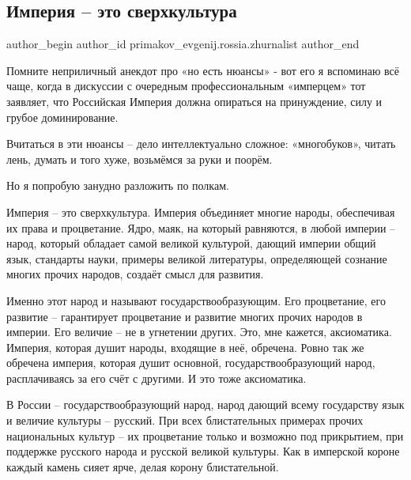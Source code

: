  
 
 
 
 
\subsection{Империя – это сверхкультура}
\label{sec:14_12_2020.fb.primakov_evgenij.rossia.zhurnalist.1.imperia_rossia}
\ifcmt
 author_begin
   author_id primakov_evgenij.rossia.zhurnalist
 author_end
\fi

Помните неприличный анекдот про «но есть нюансы» - вот его я вспоминаю всё
чаще, когда в дискуссии с очередным профессиональным «имперцем» тот заявляет,
что Российская Империя должна опираться на принуждение, силу и грубое
доминирование.

Вчитаться в эти нюансы – дело интеллектуально сложное: «многобуков», читать
лень, думать и того хуже, возьмёмся за руки и поорём. 

Но я попробую занудно разложить по полкам.

Империя – это сверхкультура. Империя объединяет многие народы, обеспечивая их
права и процветание. Ядро, маяк, на который равняются, в любой империи – народ,
который обладает самой великой культурой, дающий империи общий язык, стандарты
науки, примеры великой литературы, определяющей сознание многих прочих народов,
создаёт смысл для развития.

Именно этот народ и называют государствообразующим. Его процветание, его
развитие – гарантирует процветание и развитие многих прочих народов в империи.
Его величие – не в угнетении других. Это, мне кажется, аксиоматика. Империя,
которая душит народы, входящие в неё, обречена. Ровно так же обречена империя,
которая душит основной, государствообразующий народ, расплачиваясь за его счёт
с другими. И это тоже аксиоматика.

В России – государствообразующий народ, народ дающий всему государству язык и
величие культуры – русский. При всех блистательных примерах прочих национальных
культур – их процветание только и возможно под прикрытием, при поддержке
русского народа и русской великой культуры. Как в имперской короне каждый
камень сияет ярче, делая корону блистательной.

